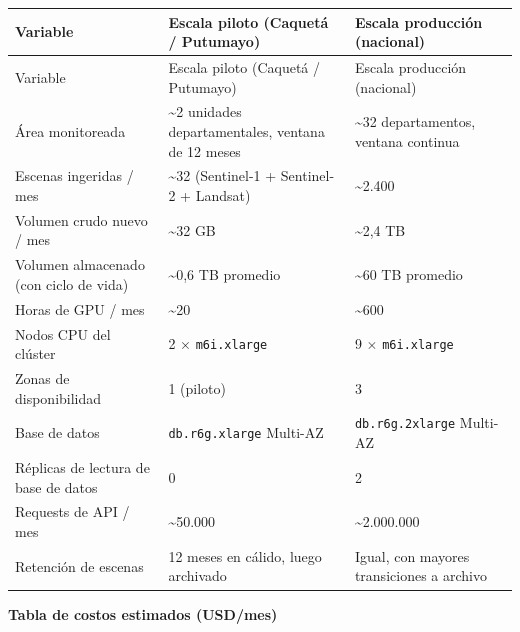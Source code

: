 \documentclass{article}
\newcommand{\mdhfour}[1]{\par\medskip\noindent\textbf{#1}\par\nobreak\smallskip}
\begin{document}
{\small
\begin{longtable}{@{}L{1.83in}L{2.34in}L{1.91in}@{}}
\toprule
Variable & Escala piloto (Caquetá / Putumayo) & Escala producción (nacional) \\
\midrule
\endfirsthead
\toprule
Variable & Escala piloto (Caquetá / Putumayo) & Escala producción (nacional) \\
\midrule
\endhead
\bottomrule
\endlastfoot
Área monitoreada & \textasciitilde{}2 unidades departamentales, ventana de 12 meses & \textasciitilde{}32 departamentos, ventana continua \\
Escenas ingeridas / mes & \textasciitilde{}32 (Sentinel-1 + Sentinel-2 + Landsat) & \textasciitilde{}2.400 \\
Volumen crudo nuevo / mes & \textasciitilde{}32 GB & \textasciitilde{}2,4 TB \\
Volumen almacenado (con ciclo de vida) & \textasciitilde{}0,6 TB promedio & \textasciitilde{}60 TB promedio \\
Horas de GPU / mes & \textasciitilde{}20 & \textasciitilde{}600 \\
Nodos CPU del clúster & 2 \ensuremath{\times} \texttt{m6i.\allowbreak{}xlarge} & 9 \ensuremath{\times} \texttt{m6i.\allowbreak{}xlarge} \\
Zonas de disponibilidad & 1 (piloto) & 3 \\
Base de datos & \texttt{db.\allowbreak{}r6g.\allowbreak{}xlarge} Multi-AZ & \texttt{db.\allowbreak{}r6g.\allowbreak{}2xlarge} Multi-AZ \\
Réplicas de lectura de base de datos & 0 & 2 \\
Requests de API / mes & \textasciitilde{}50.000 & \textasciitilde{}2.000.000 \\
Retención de escenas & 12 meses en cálido, luego archivado & Igual, con mayores transiciones a archivo \\
\end{longtable}
}

\mdhfour{Tabla de costos estimados (USD/mes)}
\end{document}
